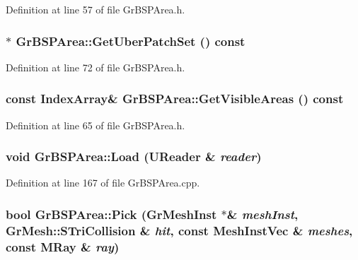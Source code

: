 Definition at line 57 of file GrBSPArea.h.\hypertarget{class_gr_b_s_p_area_248885c47602b8b30198e011d05a9b1b}{
\subsubsection[{GetUberPatchSet}]{$\ast$ GrBSPArea::GetUberPatchSet () const}}
\label{class_gr_b_s_p_area_248885c47602b8b30198e011d05a9b1b}




Definition at line 72 of file GrBSPArea.h.\hypertarget{class_gr_b_s_p_area_19f3afae82383d85b1afce1119b9c01e}{
\subsubsection[{GetVisibleAreas}]{\setlength{\rightskip}{0pt plus 5cm}const {\bf IndexArray}\& GrBSPArea::GetVisibleAreas () const}}
\label{class_gr_b_s_p_area_19f3afae82383d85b1afce1119b9c01e}




Definition at line 65 of file GrBSPArea.h.\hypertarget{class_gr_b_s_p_area_e0b79578e1c1ffc335e6f37d7daf6349}{
\subsubsection[{Load}]{\setlength{\rightskip}{0pt plus 5cm}void GrBSPArea::Load ({\bf UReader} \& {\em reader})}}
\label{class_gr_b_s_p_area_e0b79578e1c1ffc335e6f37d7daf6349}




Definition at line 167 of file GrBSPArea.cpp.\hypertarget{class_gr_b_s_p_area_9f8a64fe54421b7a44623384ec846477}{
\subsubsection[{Pick}]{\setlength{\rightskip}{0pt plus 5cm}bool GrBSPArea::Pick ({\bf GrMeshInst} $\ast$\& {\em meshInst}, \/  {\bf GrMesh::STriCollision} \& {\em hit}, \/  const {\bf MeshInstVec} \& {\em meshes}, \/  const {\bf MRay} \& {\em ray})}}
\label{class_gr_b_s_p_area_9f8a64fe54421b7a44623384ec846477}




